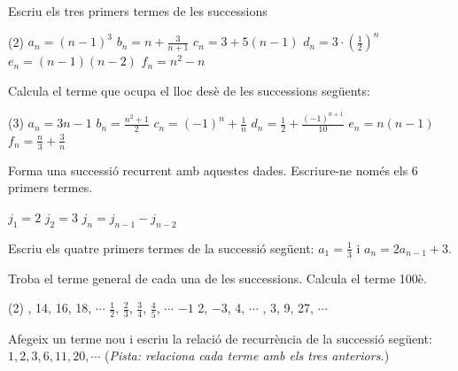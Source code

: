 \begin{mylist}
	
	\item Escriu els tres primers termes de les successions
	\begin{tasks}(2)
		\task $a_n = (n-1)^3$
		\task $b_n = n + \frac{3}{n+1}$
		\task $c_n = 3 + 5(n-1)$
		\task $d_n = 3 \cdot \left( \frac{1}{2} \right)^n$
		\task $e_n = (n-1)(n-2)$
		\task $f_n = n^2 - n$
	\end{tasks}
	
	\item Calcula el terme que ocupa el lloc desè de les successions següents:
	\begin{tasks}(3)
		\task $a_n = 3n-1$
		\task $b_n = \frac{n^2+1}{2}$
		\task $c_n = (-1)^n + \frac{1}{n}$
		\task $d_n=\frac{1}{2}+\frac{(-1)^{n+1}}{10}$
		\task $e_n = n (n-1)$
		\task $f_n = \frac{n}{3} + \frac{3}{n}$
	\end{tasks}
	
	\item Forma una successió recurrent amb aquestes dades. Escriure-ne només els 6 primers termes.
	
	\qquad $j_1=2$  \qquad $j_2=3$  \qquad $j_n=j_{n-1} - j_{n-2}$  
 	
	\item Escriu els quatre primers termes de la successió següent: $a_1=\frac{1}{3}$ i $a_n = 2 a_{n-1}+3$.
	
	\item Troba el terme general de cada una de les successions. Calcula el terme 100è.
	\begin{tasks}(2)
		, 14, 16, 18, $\cdots$
		\task $\frac{1}{2}$, $\frac{2}{3}$, $\frac{3}{4}$, $\frac{4}{5}$, $\cdots$
		\task $-1$ 2, $-3$, 4, $\cdots$
		, 3, 9, 27, $\cdots$
	\end{tasks}
	
	\item Afegeix un terme nou i escriu la relació de recurrència de la successió següent: 
	$1, 2, 3, 6, 11, 20, \cdots$  (\textit{Pista: relaciona cada terme amb els tres anteriors.})
	

\end{mylist}
